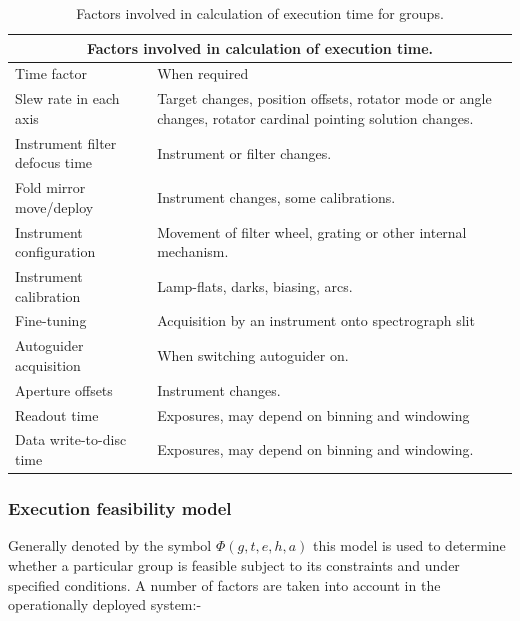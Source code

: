 \begin{table}[htbp]
\begin{center}
\begin{tabular}{lp{20em}}
\toprule
\multicolumn{2}{c}{Factors involved in calculation of execution time.} \\
\midrule
Time factor & When required \\
\midrule
Slew rate in each axis & Target changes, position offsets, rotator mode or angle changes, rotator cardinal pointing solution changes.\\
Instrument filter defocus time & Instrument or filter changes. \\
Fold mirror move/deploy & Instrument changes, some calibrations. \\
Instrument configuration & Movement of filter wheel, grating or other internal mechanism. \\
Instrument calibration & Lamp-flats, darks, biasing, arcs. \\
Fine-tuning & Acquisition by an instrument onto spectrograph slit \\
Autoguider acquisition & When switching autoguider on. \\
Aperture offsets & Instrument changes. \\
Readout time & Exposures, may depend on binning and windowing \\
Data write-to-disc time  & Exposures, may depend on binning and windowing. \\
\bottomrule
\end{tabular}
\end{center}
\caption[Factors involved in calculation of execution time for groups.]
{Factors involved in calculation of execution time for groups.}
\label{tab:exectime_factors}
\end{table}


\subsubsection{Execution feasibility model}
Generally denoted by the symbol $\Phi(g,t,e,h,a)$ this model is used to determine whether a particular group is feasible subject to its constraints and under specified conditions. A number of factors are taken into account in the operationally deployed system:-

